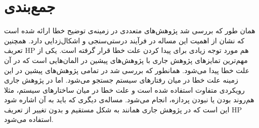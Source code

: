 \section{جمع‌بندی}
همان طور که بررسی شد پژوهش‌های متعددی در زمینه‌ی توضیح خطا ارائه شده است که نشان از اهمیت این مساله در فرآیند درستی‌سنجی و اشکال‌زدایی دارد.
همچنین تعریف 
HP
هم مورد توجه زیادی برای پیدا کردن علت خطا قرار گرفته است.
یکی از مهم‌ترین تمایز‌های پژوهش جاری با پژوهش‌های پیشین در المان‌هایی است که در آن علت خطا پیدا می‌شود. 
همانطور که بررسی شد در تمامی پژوهش‌های پیشین در این زمینه علت خطا در میان رفتارهای سیستم جستجو می‌شود. 
اما در پژوهش جاری رویکردی متفاوت استفاده شده است و علت خطا در میان ساختار‌های سیستم، مثلا هم‌روند بودن یا نبودن پردازه، انجام می‌شود.
مساله‌ی دیگری که باید به آن اشاره شود این است که در پژوهش جاری همانند
\cite{chockler,Chockler_Halpern_Kupferman_2008}
به شکل مستقیم و بدون تغییر از تعریف 
HP
استفاده می‌شود.